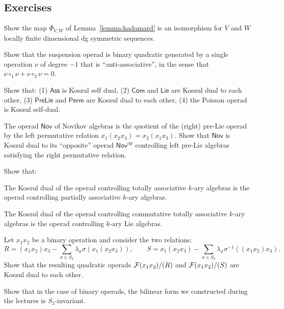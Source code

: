 \subsection{Exercises}

\begin{question}\label{ex:suspensions}
Show the map $\Phi_{V,W}$ of Lemma~\ref{lemma:hadamard}
is an isomorphism for $V$ and $W$ locally finite dimensional
dg symmetric sequences.
\end{question}

\begin{question}\label{ex:suspensionoperad}
Show that the suspension operad is binary quadratic
generated by a single operation $\nu$ of degree $-1$
that is ``anti-associative'', in the sense that
$\nu\circ_1\nu + \nu\circ_2\nu=0$. 
\end{question}
\begin{question} Show that:
(1) $\mathsf{Ass}$ is Koszul
self dual, (2) $\mathsf{Com}$ and $\mathsf{Lie}$
are Koszul dual to each other, (3) $\mathsf{PreLie}$
and $\mathsf{Perm}$ are Koszul dual to each
other, (4) the Poisson operad is Koszul self-dual.
\end{question}

\begin{question} 
The operad $\mathsf{Nov}$ of Novikov algebras
is the quotient of the (right) pre-Lie operad by the 
left permutative relation
$x_1(x_2x_3) = x_2(x_1x_3)$.
Show that $\mathsf{Nov}$ is Koszul dual to its
``opposite'' operad $\mathsf{Nov}^\mathrm{op}$
controlling left pre-Lie algebras satisfying the
right permutative relation. 
\end{question}

\begin{question}
Show that:
\begin{tenumerate}
\item 
The Koszul dual of the operad controlling
totally associative $k$-ary algebras is the
operad controlling partially associative
$k$-ary algebras.
\item The Koszul dual of the operad controlling
commutative totally associative $k$-ary algebras
is the operad controlling $k$-ary Lie algebras. 
\end{tenumerate}
\end{question}

\begin{question}
Let $x_1x_2$ be a binary operation and consider
the two relations:
\[
  R = (x_1x_2)x_3 -
   	\sum_{\sigma \in S_3} 
   		\lambda_\sigma \sigma(x_1(x_2x_3)),
   		\qquad
   		S = x_1(x_2x_3) - 
   	\sum_{\sigma \in S_3} 
   		\lambda_\sigma \sigma^{-1}((x_1x_2)x_3).
 	\]
Show that the resulting quadratic operads $\mathcal{F}(x_1x_2)/(R)$
and $\mathcal{F}(x_1x_2)/(S)$ are Koszul dual to each other.
\end{question}

\begin{question}
Show that in the case of binary operads,
the bilinear form we constructed 
during the lectures is $S_3$-invariant.
\end{question}

